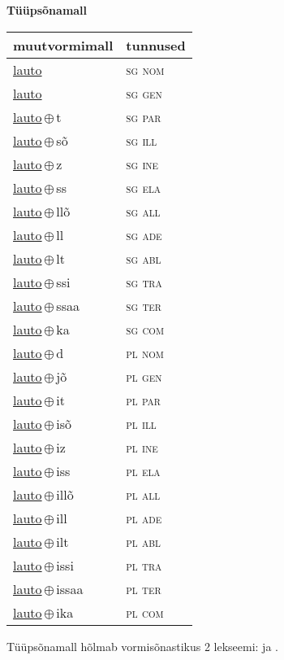 

\vspace{3.5em}
\noindent \begin{minipage}{\textwidth}
\noindent \textbf{Tüüpsõnamall \,}\\

\begin{sideways}
\begin{tabular}{l l}
muutvormimall & tunnused \\
\hline
\underline{lauto} & \textsc{ sg nom } \\
\underline{lauto} & \textsc{ sg gen } \\
\underline{lauto}\,$\oplus$\,t & \textsc{ sg par } \\
\underline{lauto}\,$\oplus$\,sõ & \textsc{ sg ill } \\
\underline{lauto}\,$\oplus$\,z & \textsc{ sg ine } \\
\underline{lauto}\,$\oplus$\,ss & \textsc{ sg ela } \\
\underline{lauto}\,$\oplus$\,llõ & \textsc{ sg all } \\
\underline{lauto}\,$\oplus$\,ll & \textsc{ sg ade } \\
\underline{lauto}\,$\oplus$\,lt & \textsc{ sg abl } \\
\underline{lauto}\,$\oplus$\,ssi & \textsc{ sg tra } \\
\underline{lauto}\,$\oplus$\,ssaa & \textsc{ sg ter } \\
\underline{lauto}\,$\oplus$\,ka & \textsc{ sg com } \\
\underline{lauto}\,$\oplus$\,d & \textsc{ pl nom } \\
\underline{lauto}\,$\oplus$\,jõ & \textsc{ pl gen } \\
\underline{lauto}\,$\oplus$\,it & \textsc{ pl par } \\
\underline{lauto}\,$\oplus$\,isõ & \textsc{ pl ill } \\
\underline{lauto}\,$\oplus$\,iz & \textsc{ pl ine } \\
\underline{lauto}\,$\oplus$\,iss & \textsc{ pl ela } \\
\underline{lauto}\,$\oplus$\,illõ & \textsc{ pl all } \\
\underline{lauto}\,$\oplus$\,ill & \textsc{ pl ade } \\
\underline{lauto}\,$\oplus$\,ilt & \textsc{ pl abl } \\
\underline{lauto}\,$\oplus$\,issi & \textsc{ pl tra } \\
\underline{lauto}\,$\oplus$\,issaa & \textsc{ pl ter } \\
\underline{lauto}\,$\oplus$\,ika & \textsc{ pl com } \\
\end{tabular}
\end{sideways}
\label{tab:tüüpsõnamall-lauto}

\end{minipage}

 
\vspace{1em}
\noindent Tüüpsõnamall  hõlmab vormisõnastikus 2 lekseemi:  ja .
